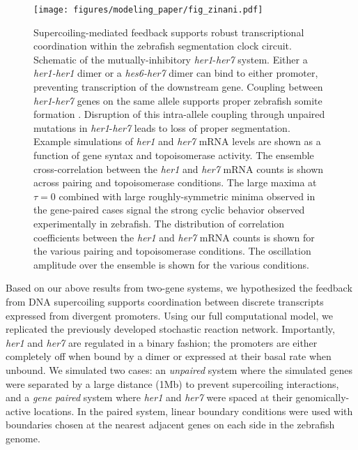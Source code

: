 \documentclass[11pt]{article} %
\begin{document}
\begin{figure}[htbp]
    \centering
    {\texttt{[image: figures/modeling\_paper/fig\_zinani.pdf]}
    \label{fig:her1_her7_cartoon}
    \label{fig:zinani_summary_cartoon}
    \label{fig:zinani_mRNA_behavior}
    \label{fig:zinani_cross_correlation}
    \label{fig:zinani_correlation_coeff}
    \label{fig:zinani_oscillation_amplitude}
    }
\end{figure}
\begin{figure}[htbp]
    \ContinuedFloat
    \caption{Supercoiling-mediated feedback supports robust transcriptional coordination within the zebrafish segmentation clock circuit.
         Schematic of the mutually-inhibitory \textit{her1}-\textit{her7} system. Either a \textit{her1-her1} dimer or a \textit{hes6-her7} dimer can bind to either promoter, preventing transcription of the downstream gene.
         Coupling between \textit{her1}-\textit{her7} genes on the same allele supports proper zebrafish somite formation \parencite{zinaniPairingSegmentationClock2021}. Disruption of this intra-allele coupling through unpaired mutations in \textit{her1}-\textit{her7} leads to loss of proper segmentation.
         Example simulations of \textit{her1} and \textit{her7} mRNA levels are shown as a function of gene syntax and topoisomerase activity.
         The ensemble cross-correlation between the \textit{her1} and \textit{her7} mRNA counts is shown across pairing and topoisomerase conditions.  The large maxima at \(\tau = 0\) combined with large roughly-symmetric minima observed in the gene-paired cases signal the strong cyclic behavior observed experimentally in zebrafish.
         The distribution of correlation coefficients between the \textit{her1} and \textit{her7} mRNA counts is shown for the various pairing and topoisomerase conditions. 
         The oscillation amplitude over the ensemble is shown for the various conditions. 
    } \label{fig:top:her1_her7}
\end{figure}
Based on our above results from two-gene systems, we hypothesized the feedback from DNA supercoiling supports coordination between discrete transcripts expressed from divergent promoters. Using our full computational model, we replicated the previously developed stochastic reaction network. Importantly, \textit{her1} and \textit{her7} are regulated in a binary fashion; the promoters are either completely off when bound by a dimer or expressed at their basal rate when unbound. We simulated two cases: an \emph{unpaired} system where the simulated genes were separated by a large distance (1Mb) to prevent supercoiling interactions, and a \emph{gene paired} system where \textit{her1} and \textit{her7} were spaced at their genomically-active locations. In the paired system, linear boundary conditions were used with boundaries chosen at the nearest adjacent genes on each side in the zebrafish genome.
\end{document}
